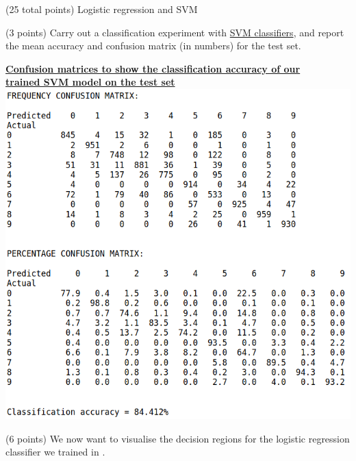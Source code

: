 \documentclass[12pt]{article}
\begin{document}
\begin{question}{(25 total points) Logistic regression and SVM}
\begin{subquestion}
   \end{subquestion}
   \begin{subquestion}{(3 points)
       Carry out a classification experiment with
       \href{https://scikit-learn.org/0.19/modules/generated/sklearn.svm.SVC.html}{SVM classifiers}, and report the
       mean accuracy and confusion matrix (in numbers) for the test
       set.
     } \label{Q2.2}


   

      \begin{answerbox}{40em}
        \begin{center}
        \textbf{\underline{\large{Confusion matrices to show the classification accuracy of our}}}\\
        \textbf{\underline{\large{trained SVM model on the test set}}}
        \vspace{0.3cm}\\
         \includegraphics[width=1\textwidth]{images/q22.png}
        \end{center}
      \end{answerbox}
  


   \end{subquestion}
   \begin{subquestion}{(6 points)
       We now want to visualise the decision regions for the logistic
       regression classifier we trained in .
     } \label{Q2.3}



\end{subquestion}
\end{question}
\end{document}
